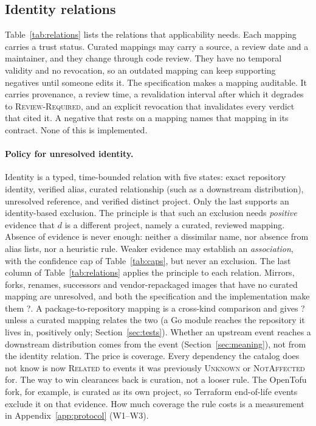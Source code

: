 \documentclass[11pt,a4paper]{article}
\newcommand{\Ind}{\textsf{?}}
\begin{document}
\subsection{Identity relations}
\label{sec:identity}
Table~\ref{tab:relations} lists the relations that applicability
needs. Each mapping carries a trust status. Curated mappings may carry
a source, a review date and a maintainer, and they change through code
review. They have no temporal validity and no revocation, so an
outdated mapping can keep supporting negatives until someone edits it.
The specification makes a mapping auditable. It carries provenance, a
review time, a revalidation interval after which it degrades to
\textsc{Review-Required}, and an explicit revocation that invalidates
every verdict that cited it. A negative that rests on a mapping names
that mapping in its contract. None of this is implemented.

\paragraph{Policy for unresolved identity.} Identity is a typed,
time-bounded relation with five states: exact repository identity,
verified alias, curated relationship (such as a downstream
distribution), unresolved reference, and verified distinct project.
Only the last supports an identity-based exclusion. The principle is
that such an exclusion needs \emph{positive} evidence that $d$ is a
different project, namely a curated, reviewed mapping. Absence of
evidence is never enough: neither a dissimilar name, nor absence from
alias lists, nor a heuristic rule. Weaker evidence may establish an
\emph{association}, with the confidence cap of Table~\ref{tab:caps},
but never an exclusion. The last column of Table~\ref{tab:relations}
applies the principle to each relation. Mirrors, forks, renames,
successors and vendor-repackaged images that have no curated mapping
are unresolved, and both the specification and the implementation
make them \Ind{}. A
package-to-repository mapping is a cross-kind comparison and gives
\Ind{} unless a curated mapping relates the two (a Go module reaches
the repository it lives in, positively only;
Section~\ref{sec:tests}). Whether an upstream
event reaches a downstream distribution comes from the event
(Section~\ref{sec:meaning}), not from the identity relation. The
price is coverage. Every dependency the catalog does not know is now
\textsc{Related} to events it was previously \textsc{Unknown} or
\textsc{NotAffected} for. The way to win clearances back is curation,
not a looser rule. The OpenTofu fork, for example, is curated as its
own project, so Terraform end-of-life events exclude it on that
evidence. How much coverage the rule costs is a measurement in
Appendix~\ref{app:protocol} (W1--W3).
\end{document}
